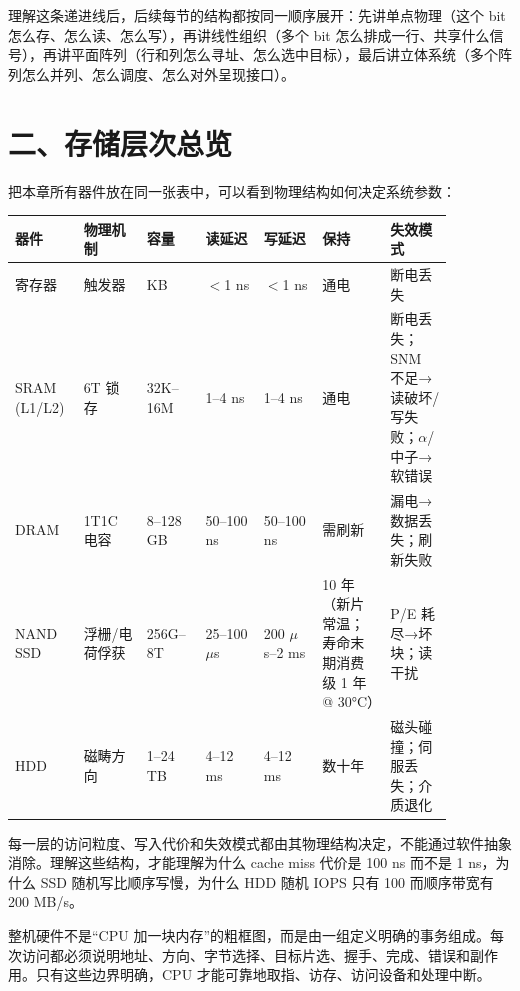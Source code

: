 理解这条递进线后，后续每节的结构都按同一顺序展开：先讲单点物理（这个 bit 怎么存、怎么读、怎么写），再讲线性组织（多个 bit 怎么排成一行、共享什么信号），再讲平面阵列（行和列怎么寻址、怎么选中目标），最后讲立体系统（多个阵列怎么并列、怎么调度、怎么对外呈现接口）。

\section{二、存储层次总览}

把本章所有器件放在同一张表中，可以看到物理结构如何决定系统参数：

\begin{longtable}{L{0.11\linewidth}L{0.13\linewidth}L{0.12\linewidth}L{0.12\linewidth}L{0.12\linewidth}L{0.14\linewidth}L{0.13\linewidth}}
\toprule
器件 & 物理机制 & 容量 & 读延迟 & 写延迟 & 保持 & 失效模式 \\
\midrule
寄存器 & 触发器 & KB & $<$1 ns & $<$1 ns & 通电 & 断电丢失 \\\tablerowrule
SRAM (L1/L2) & 6T 锁存 & 32K--16M & 1--4 ns & 1--4 ns & 通电 & 断电丢失；SNM 不足→读破坏/写失败；$\alpha$/中子→软错误 \\\tablerowrule
DRAM & 1T1C 电容 & 8--128 GB & 50--100 ns & 50--100 ns & 需刷新 & 漏电→数据丢失；刷新失败 \\\tablerowrule
NAND SSD & 浮栅/电荷俘获 & 256G--8T & 25--100 $\mu$s & 200 $\mu$s--2 ms & 10 年（新片常温；寿命末期消费级 1 年 @ 30°C） & P/E 耗尽→坏块；读干扰 \\\tablerowrule
HDD & 磁畴方向 & 1--24 TB & 4--12 ms & 4--12 ms & 数十年 & 磁头碰撞；伺服丢失；介质退化 \\
\bottomrule
\end{longtable}

每一层的访问粒度、写入代价和失效模式都由其物理结构决定，不能通过软件抽象消除。理解这些结构，才能理解为什么 cache miss 代价是 100 ns 而不是 1 ns，为什么 SSD 随机写比顺序写慢，为什么 HDD 随机 IOPS 只有 100 而顺序带宽有 200 MB/s。

\begin{keyidea}
整机硬件不是“CPU 加一块内存”的粗框图，而是由一组定义明确的事务组成。每次访问都必须说明地址、方向、字节选择、目标片选、握手、完成、错误和副作用。只有这些边界明确，CPU 才能可靠地取指、访存、访问设备和处理中断。
\end{keyidea}

